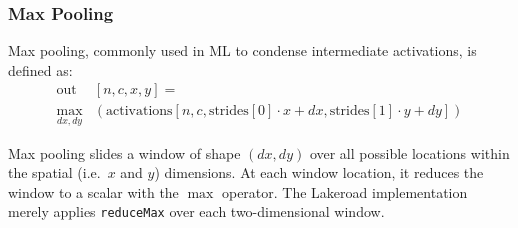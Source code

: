 \documentclass[prologue, dvipsnames, sigplan, screen, review, anonymous]{acmart}
\newcommand{\g}{Lakeroad\xspace}
\newcommand{\accesspatternshape}[2]{$($$\left( #1 \right)$, $\left( #2 \right)$$)$}
\begin{document}
%
%  

\subsubsection{Max Pooling}

Max pooling, commonly used in ML
  to condense intermediate activations,
  is defined as:
\begin{equation*}%
\begin{split} 
\mbox{out}&[n, c, x, y] =\\
\max_{dx, dy}&
           (\mbox{activations}[n, c,
                       \mbox{strides}[0] \cdot x  + dx,  
                       \mbox{strides}[1] \cdot y + dy])
\end{split}
\end{equation*}

Max pooling 
  slides a window
  of shape $(dx, dy)$
  over all possible locations
  within the spatial (i.e.~$x$ and $y$)
  dimensions.
At each window location,
  it reduces the window
  to a scalar
  with the $\max$ operator.
The \g implementation merely applies
  \texttt{reduceMax} 
  over each two-dimensional window.
  
\end{document}
